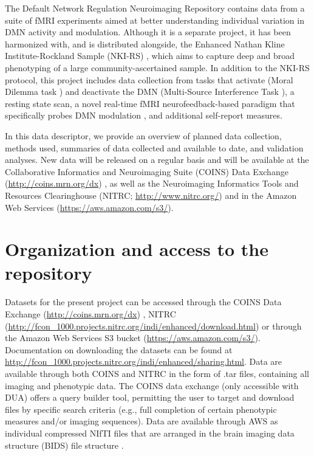 The Default Network Regulation Neuroimaging Repository contains data from a suite of fMRI experiments aimed at better understanding individual variation in DMN activity and modulation. Although it is a separate project, it has been harmonized with, and is distributed alongside, the Enhanced Nathan Kline Institute-Rockland Sample (NKI-RS) \cite{Nooner2012}, which aims to capture deep and broad phenotyping of a large community-ascertained sample. In addition to the NKI-RS protocol, this project includes data collection from tasks that activate (Moral Dilemma task \cite{Harrison2008}) and deactivate the DMN (Multi-Source Interference Task \cite{Bush2006}), a resting state scan, a novel real-time fMRI neurofeedback-based paradigm that specifically probes DMN modulation \cite{Craddock2012}, and additional self-report measures.

In this data descriptor, we provide an overview of planned data collection, methods used, summaries of data collected and available to date, and validation analyses. New data will be released on a regular basis and will be available at the Collaborative Informatics and Neuroimaging Suite (COINS) Data Exchange (\url{http://coins.mrn.org/dx}) \cite{Scott2011,Wood2014}, as well as the Neuroimaging Informatics Tools and Resources Clearinghouse (NITRC; \url{http://www.nitrc.org/}) and in the Amazon Web Services (\url{https://aws.amazon.com/s3/}).

\section{Organization and access to the repository}

Datasets for the present project can be accessed through the COINS Data Exchange (\url{http://coins.mrn.org/dx}) \cite{Scott2011,Wood2014}, NITRC (\url{http://fcon\_1000.projects.nitrc.org/indi/enhanced/download.html}) or through the Amazon Web Services S3 bucket (\url{https://aws.amazon.com/s3/}). Documentation on downloading the datasets can be found at \url{http://fcon\_1000.projects.nitrc.org/indi/enhanced/sharing.html}. Data are available through both COINS and NITRC in the form of .tar files, containing all imaging and phenotypic data. The COINS data exchange (only accessible with DUA) offers a query builder tool, permitting the user to target and download files by specific search criteria (e.g., full completion of certain phenotypic measures and/or imaging sequences). Data are available through AWS as individual compressed NIfTI files that are arranged in the brain imaging data structure (BIDS) file structure \cite{Gorgolewski2016}.

